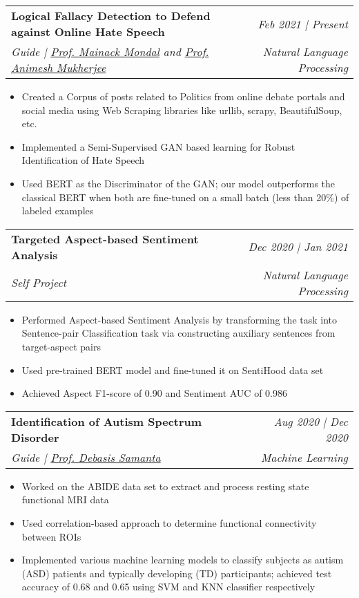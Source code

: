 \documentclass[a4,10pt]{article}
\makeatletter
\newcommand{\resumeSubheading}[4]{
  \vspace{-1pt}\item
    \begin{tabular*}{0.97\textwidth}{l@{\extracolsep{\fill}}r}
      \textbf{#1} & #2 \\
      \small#3 & \small#4\\
    \end{tabular*}\vspace{-5pt}
}
\makeatother
\begin{document}
    \resumeSubheading
      {Logical Fallacy Detection to Defend against Online Hate Speech}{\textit{Feb 2021 | Present}}
      {\textit{Guide | \href{https://cse.iitkgp.ac.in/~mainack/}{Prof. Mainack Mondal} and \href{https://cse.iitkgp.ac.in/~animeshm/}{Prof. Animesh Mukherjee}}}{\textit{Natural Language Processing}}
      \begin{itemize}
          \itemsep-0.15em
          \item {Created a Corpus of posts related to Politics from online debate portals and social media using Web Scraping libraries like urllib, scrapy, BeautifulSoup, etc.}
          \item {Implemented a Semi-Supervised GAN based learning for Robust Identification of Hate Speech}
          \item {Used BERT as the Discriminator of the GAN; our model outperforms the classical BERT when both are fine-tuned on a small batch (less than 20\%) of labeled examples}
      \end{itemize}
  
    \resumeSubheading
      {Targeted Aspect-based Sentiment Analysis \href{https://github.com/utkarsh512/ABSA-Bert}{\faGithub}}{\textit{Dec 2020 | Jan 2021}}
      {\textit{Self Project}}{\textit{Natural Language Processing}}
      \begin{itemize}
          \itemsep-0.15em
          \item {Performed Aspect-based Sentiment Analysis by transforming the task into Sentence-pair Classification task via constructing auxiliary sentences from target-aspect pairs}
          \item {Used pre-trained BERT model and fine-tuned it on SentiHood data set}
          \item {Achieved Aspect F1-score of 0.90 and Sentiment AUC of 0.986}
      \end{itemize}
    
    \resumeSubheading
      {Identification of Autism Spectrum Disorder \href{https://github.com/utkarsh512/Autism}{\faGithub}}{\textit{{Aug 2020 | Dec 2020}}}
      {\textit{Guide | \href{https://cse.iitkgp.ac.in/~dsamanta/}{Prof. Debasis Samanta}}}{\textit{Machine Learning}}
      \begin{itemize}
          \itemsep-0.15em
          \item {Worked on the ABIDE data set to extract and process resting state functional MRI data}
          \item {Used correlation-based approach to determine functional connectivity between ROIs}
          \item {Implemented various machine learning models to classify subjects as autism (ASD) patients and typically developing (TD) participants; achieved test accuracy of 0.68 and 0.65 using SVM and KNN classifier respectively}
      \end{itemize}
\end{document}
